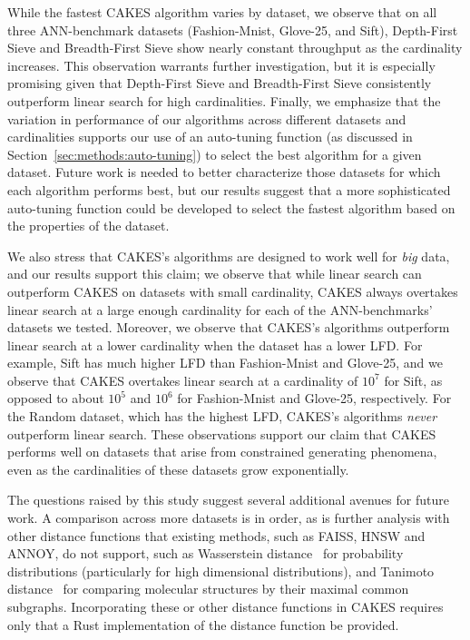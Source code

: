 While the fastest CAKES algorithm varies by dataset, we observe that on all three ANN-benchmark datasets (Fashion-Mnist, Glove-25, and Sift), Depth-First Sieve and Breadth-First Sieve show nearly constant throughput as the cardinality increases.
This observation warrants further investigation, but it is especially promising given that Depth-First Sieve and Breadth-First Sieve consistently outperform linear search for high cardinalities.
Finally, we emphasize that the variation in performance of our algorithms across different datasets and cardinalities supports our use of an auto-tuning function (as discussed in Section~\ref{sec:methods:auto-tuning}) to select the best algorithm for a given dataset.
Future work is needed to better characterize those datasets for which each algorithm performs best, but our results suggest that a more sophisticated auto-tuning function could be developed to select the fastest algorithm based on the properties of the dataset.

We also stress that CAKES's algorithms are designed to work well for \textit{big} data, and our results support this claim;
we observe that while linear search can outperform CAKES on datasets with small cardinality, CAKES always overtakes linear search at a large enough cardinality for each of the ANN-benchmarks' datasets we tested.
Moreover, we observe that CAKES's algorithms outperform linear search at a lower cardinality when the dataset has a lower LFD.
For example, Sift has much higher LFD than Fashion-Mnist and Glove-25, and we observe that CAKES overtakes linear search at a cardinality of $10^7$ for Sift, as opposed to about $10^5$ and $10^6$ for Fashion-Mnist and Glove-25, respectively.
For the Random dataset, which has the highest LFD, CAKES's algorithms \textit{never} outperform linear search.
These observations support our claim that CAKES performs well on datasets that arise from constrained generating phenomena, even as the cardinalities of these datasets grow exponentially.

The questions raised by this study suggest several additional avenues for future work.
A comparison across more datasets is in order, as is further analysis with other distance functions that existing methods, such as FAISS, HNSW and ANNOY, do not support, such as Wasserstein distance~\cite{vallender1974calculation} for probability distributions (particularly for high dimensional distributions), and Tanimoto distance~\cite{bajusz2015tanimoto} for comparing molecular structures by their maximal common subgraphs.
Incorporating these or other distance functions in CAKES requires only that a Rust implementation of the distance function be provided.

